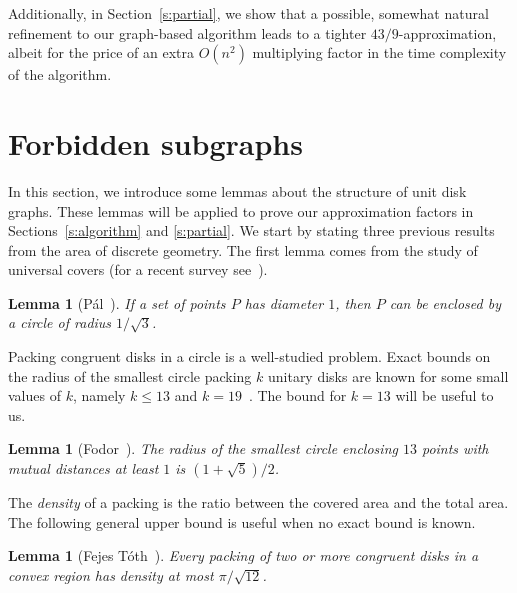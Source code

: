 \documentclass[preprint,12pt]{elsarticle}
\newtheorem{lem}[thm]{Lemma}
\begin{document}
Additionally, in Section~\ref{s:partial}, we show that a possible, somewhat natural refinement to our graph-based algorithm leads to a tighter $43/9$-approximation, albeit for the price of an extra $O(n^2)$ multiplying factor in the time complexity of the algorithm.


\section{Forbidden subgraphs} \label{s:forbidden}

In this section, we introduce some lemmas about the structure of unit disk graphs. These lemmas will be applied to prove our approximation factors in Sections~\ref{s:algorithm} and \ref{s:partial}. We start by stating three previous results from the area of discrete geometry. The first lemma comes from the study of universal covers  (for a recent survey see~\cite{constants}).
\begin{lem}[P\'al~\cite{pal}]\label{l:universal_cover}
If a set of points $P$ has diameter $1$, then $P$ can be enclosed by a circle of radius $1/\sqrt{3}$.
\end{lem}

Packing congruent disks in a circle is a well-studied problem. Exact bounds on the radius of the smallest circle packing $k$ unitary disks are known for some small values of $k$, namely $k \leq 13$ and $k=19$~\cite{Fodor}. The bound for $k=13$ will be useful to us.
\begin{lem}[Fodor~\cite{Fodor}]\label{l:pack13}
The radius of the smallest circle enclosing $13$ points with mutual distances at least $1$ is $(1+\sqrt{5})/2$.
\end{lem}

The \emph{density} of a packing is the ratio between the covered area and the total area. The following general upper bound is useful when no exact bound is known.
\begin{lem}[Fejes T\'oth~\cite{density}]\label{l:density}
Every packing of two or more congruent disks in a convex region has density at most $\pi/\sqrt{12}$.
\end{lem}
\end{document}
